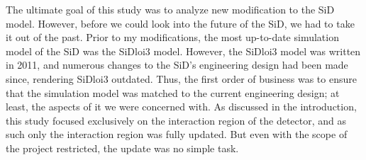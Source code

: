 \documentclass{report}
\begin{document}
            The ultimate goal of this study was to analyze new modification to the SiD model. However, before we could look into the future of the SiD, we had to take it out of the past. Prior to my modifications, the most up-to-date simulation model of the SiD was the SiDloi3 model. However, the SiDloi3 model was written in 2011, and numerous changes to the SiD's engineering design had been made since, rendering SiDloi3 outdated. Thus, the first order of business was to ensure that the simulation model was matched to the current engineering design; at least, the aspects of it we were concerned with. As discussed in the introduction, this study focused exclusively on the interaction region of the detector, and as such only the interaction region was fully updated. But even with the scope of the project restricted, the update was no simple task.
\end{document}
